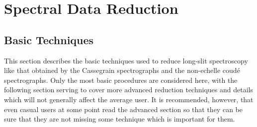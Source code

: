 %
%
%
%
%


%
%
%
%
%
%

\chapter{Spectral Data Reduction}

\section{Basic Techniques}

This section describes the basic techniques used to reduce long-slit
spectroscopy like that obtained by the Cassegrain spectrographs and the
non-echelle coud\'e spectrographs.  Only the most basic procedures are
considered here, with the following section serving to cover more advanced
reduction techniques and details which will not generally affect the average
user.  It is recommended, however, that even casual users at some point read
the advanced section so that they can be sure that they are not missing some
technique which is important for them.

